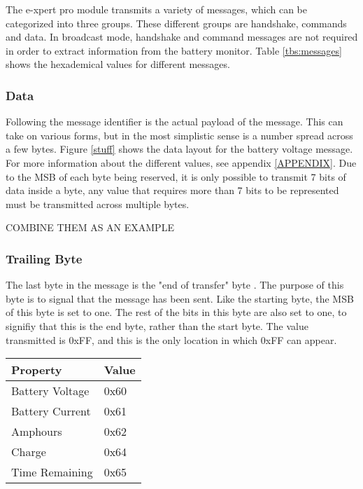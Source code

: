 The e-xpert pro module transmits a variety of messages, which can be categorized into three groups. These different groups are handshake, commands and data. In broadcast mode, handshake and command messages are not required in order to extract information from the battery monitor. Table \ref{tbs:messages} shows the hexademical values for different messages.

\subsubsection{Data}

Following the message identifier is the actual payload of the message. This can take on various forms, but in the most simplistic sense is a number spread across a few bytes. Figure \ref{stuff} shows the data layout for the battery voltage message. For more information about the different values, see appendix \ref{APPENDIX}.  Due to the MSB of each byte being reserved, it is only possible to transmit 7 bits of data inside a byte, any value that requires more than 7 bits to be represented must be transmitted across multiple bytes.  

COMBINE THEM AS AN EXAMPLE

\subsubsection{Trailing Byte}

The last byte in the message is the "end of transfer" byte \cite{e_xpert}. The purpose of this byte is to signal that the message has been sent. Like the starting byte, the MSB of this byte is set to one. The rest of the bits in this byte are also set to one, to signifiy that this is the end byte, rather than the start byte. The value transmitted is 0xFF, and this is the only location in which 0xFF can appear.


\begin{table}
\begin{center}
    \begin{tabular}{|l|l|}
        \hline
	\label{tab:tbsmessages}
        Property & Value \\ \hline
        Battery Voltage   & 0x60 \\
        Battery Current    & 0x61    \\ 
        Amphours    & 0x62    \\ 
        Charge       &  0x64 \\ 
        Time Remaining & 0x65 \\
        \hline
    \end{tabular}
\end{center}
\end{table}





